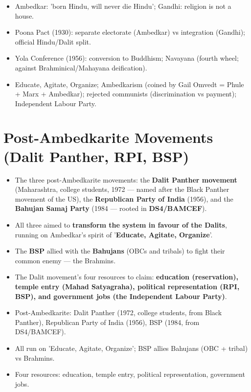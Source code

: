\begin{QuickRevision}
\begin{itemize}
\item Ambedkar: 'born Hindu, will never die Hindu'; Gandhi: religion is not a house.
\item Poona Pact (1930): separate electorate (Ambedkar) vs integration (Gandhi); official Hindu/Dalit split.
\item Yola Conference (1956): conversion to Buddhism; Navayana (fourth wheel; against Brahminical/Mahayana deification).
\item Educate, Agitate, Organize; Ambedkarism (coined by Gail Omvedt = Phule + Marx + Ambedkar); rejected communists (discrimination vs payment); Independent Labour Party.
\end{itemize}
\end{QuickRevision}

\section{Post-Ambedkarite Movements (Dalit Panther, RPI, BSP)}

\begin{KeyConcept}
\begin{itemize}
\item The three post-Ambedkarite movements: the \textbf{Dalit Panther movement} (Maharashtra, college students, 1972 --- named after the Black Panther movement of the US), the \textbf{Republican Party of India} (1956), and the \textbf{Bahujan Samaj Party} (1984 --- rooted in \textbf{DS4/BAMCEF}).
\item All three aimed to \textbf{transform the system in favour of the Dalits}, running on Ambedkar's spirit of '\textbf{Educate, Agitate, Organize}'.
\item The \textbf{BSP} allied with the \textbf{Bahujans} (OBCs and tribals) to fight their common enemy --- the Brahmins.
\item The Dalit movement's four resources to claim: \textbf{education (reservation), temple entry (Mahad Satyagraha), political representation (RPI, BSP), and government jobs (the Independent Labour Party)}.
\end{itemize}
\end{KeyConcept}

\begin{QuickRevision}
\begin{itemize}
\item Post-Ambedkarite: Dalit Panther (1972, college students, from Black Panther), Republican Party of India (1956), BSP (1984, from DS4/BAMCEF).
\item All run on 'Educate, Agitate, Organize'; BSP allies Bahujans (OBC + tribal) vs Brahmins.
\item Four resources: education, temple entry, political representation, government jobs.
\end{itemize}
\end{QuickRevision}

